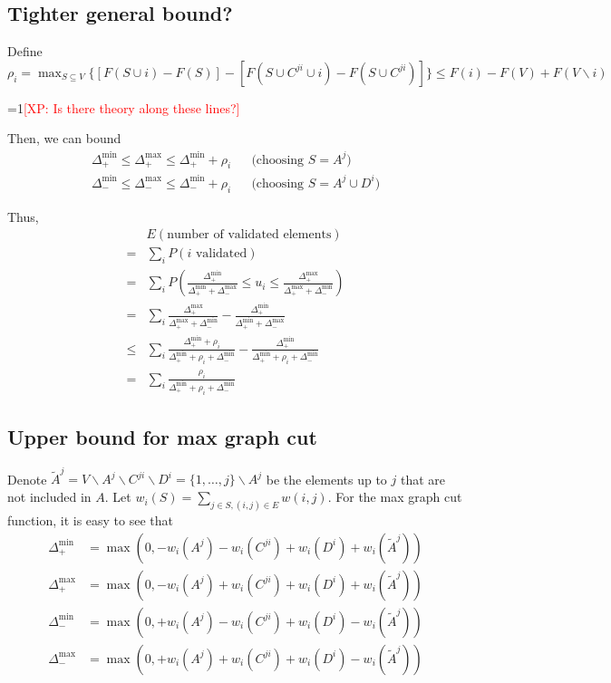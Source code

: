 \documentclass{article} %
\newcommand{\Comments}{1}
\newcommand{\note}[2]{\ifnum\Comments=1\textcolor{#1}{#2}\fi}
\newcommand{\xinghao}[1]{\note{red}{[XP: #1]}}
\begin{document}
\subsection{Tighter general bound?}
Define $\rho_i = \max_{S\subseteq V} \{[F(S\cup i) - F(S)] - [F(S \cup C^{ji} \cup i) - F(S \cup C^{ji})]\} \leq F(i) - F(V) + F(V\backslash i)$

\xinghao{Is there theory along these lines?}

Then, we can bound
\begin{align*}
\Delta_+^{\min} \leq \Delta_+^{\max} \leq \Delta_+^{\min} + \rho_i && \text{(choosing $S=A^j$)}\\
\Delta_-^{\min} \leq \Delta_-^{\max} \leq \Delta_-^{\min} + \rho_i && \text{(choosing $S=A^j\cup D^i$)}
\end{align*}

Thus,
\begin{align*}
&E(\text{number of validated elements})\\
=& \sum_i P(i \text{ validated})\\
=& \sum_i P\left(\frac{\Delta_+^{\min}}{\Delta_+^{\min} + \Delta_-^{\max}} \leq u_i \leq \frac{\Delta_+^{\max}}{\Delta_+^{\max} + \Delta_-^{\min}}\right)\\
=& \sum_i\frac{\Delta_+^{\max}}{\Delta_+^{\max} + \Delta_-^{\min}} - \frac{\Delta_+^{\min}}{\Delta_+^{\min} + \Delta_-^{\max}}\\
\leq& \sum_i\frac{\Delta_+^{\min}+\rho_i}{\Delta_+^{\min} + \rho_i + \Delta_-^{\min}} - \frac{\Delta_+^{\min}}{\Delta_+^{\min} + \rho_i + \Delta_-^{\min}}\\
=& \sum_i\frac{\rho_i}{\Delta_+^{\min} + \rho_i + \Delta_-^{\min}}
\end{align*}




\subsection{Upper bound for max graph cut}
Denote $\tilde{A}^j = V\backslash A^j\backslash C^{ji}\backslash D^i = \{1,\dots,j\}\backslash A^j$ be the elements up to $j$ that are not included in $A$.
Let $w_i(S) = \sum_{j\in S, (i,j)\in E} w(i,j)$.
For the max graph cut function, it is easy to see that 
\begin{align*}
\Delta_+^{\min} &= \max(0, - w_i(A^j) -w_i(C^{ji}) + w_i(D^i) + w_i(\tilde{A}^j))\\
\Delta_+^{\max} &= \max(0, - w_i(A^j) + w_i(C^{ji}) + w_i(D^i) + w_i(\tilde{A}^j))\\
\Delta_-^{\min} &= \max(0, + w_i(A^j) - w_i(C^{ji}) + w_i(D^i) - w_i(\tilde{A}^j))\\
\Delta_-^{\max} &= \max(0, + w_i(A^j) + w_i(C^{ji}) + w_i(D^i) - w_i(\tilde{A}^j))
\end{align*}
\end{document}
